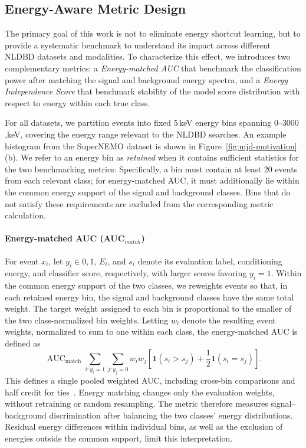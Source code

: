 \subsection{Energy-Aware Metric Design}
\label{sec:benchmarking-metrics}

The primary goal of this work is not to eliminate energy shortcut learning, but to provide a systematic benchmark to understand its impact across different NLDBD datasets and modalities. To characterize this effect, we introduces two complementary metrics: a \emph{Energy-matched AUC} that benchmark the classification power after matching the signal and background energy spectra, and a \emph{Energy Independence Score} that benchmark stability of the model score distribution with respect to energy within each true class.

For all datasets, we partition events into fixed 5\,keV energy bins spanning $0$--$3000$,keV, covering the energy range relevant to the NLDBD searches. An example histogram from the SuperNEMO dataset is shown in Figure~\ref{fig:mjd-motivation}(b). We refer to an energy bin as \emph{retained} when it contains sufficient statistics for the two benchmarking metrics: Specifically, a bin must contain at least 20 events from each relevant class; for energy-matched AUC, it must additionally lie within the common energy support of the signal and background classes. Bins that do not satisfy these requirements are excluded from the corresponding metric calculation.

\paragraph{Energy-matched AUC (AUC$_{match}$)} For event $x_i$, let $y_i\in{0,1}$, $E_i$, and $s_i$ denote its evaluation label, conditioning energy, and classifier score, respectively, with larger scores favoring $y_i=1$. Within the common energy support of the two classes, we reweights events so that, in each retained energy bin, the signal and background classes have the same total weight. The target weight assigned to each bin is proportional to the smaller of the two class-normalized bin weights. Letting $w_i$ denote the resulting event weights, normalized to sum to one within each class, the energy-matched AUC is defined as
\begin{equation}
\operatorname{AUC}_{\mathrm{match}}
\sum_{i:y_i=1}\sum_{j:y_j=0} w_i w_j
\left[
\mathbf{1}(s_i>s_j)
+\frac{1}{2}\mathbf{1}(s_i=s_j)
\right].
\end{equation}
This defines a single pooled weighted AUC, including cross-bin comparisons and half credit for ties~\citep{hanley1982meaning}. Energy matching changes only the evaluation weights, without retraining or random resampling. The metric therefore measures signal--background discrimination after balancing the two classes' energy distributions. Residual energy differences within individual bins, as well as the exclusion of energies outside the common support, limit this interpretation. 

